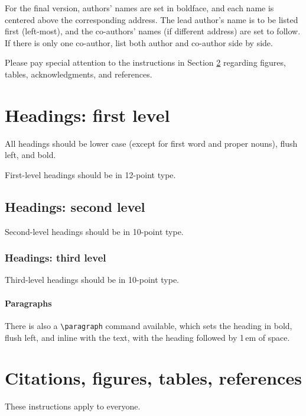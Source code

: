 \documentclass{article}
\begin{document}
For the final version, authors' names are set in boldface, and each
name is centered above the corresponding address. The lead author's
name is to be listed first (left-most), and the co-authors' names (if
different address) are set to follow. If there is only one co-author,
list both author and co-author side by side.

Please pay special attention to the instructions in Section \ref{others}
regarding figures, tables, acknowledgments, and references.

\section{Headings: first level}
\label{headings}

All headings should be lower case (except for first word and proper
nouns), flush left, and bold.

First-level headings should be in 12-point type.

\subsection{Headings: second level}

Second-level headings should be in 10-point type.

\subsubsection{Headings: third level}

Third-level headings should be in 10-point type.

\paragraph{Paragraphs}

There is also a \verb+\paragraph+ command available, which sets the
heading in bold, flush left, and inline with the text, with the
heading followed by 1\,em of space.

\section{Citations, figures, tables, references}
\label{others}

These instructions apply to everyone.
\end{document}
